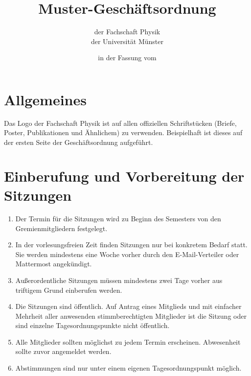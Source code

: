 


\pagestyle{scrheadings}

\title{Muster-Geschäftsordnung}
\subtitle{der Fachschaft Physik\\
der Universität Münster}
\date{in der Fassung vom }
\author{}



\maketitle

\section{Allgemeines}
Das Logo der Fachschaft Physik ist auf allen offiziellen Schriftstücken (Briefe, Poster, Publikationen und Ähnlichem) zu verwenden.
Beispielhaft ist dieses auf der ersten Seite der Geschäftsordnung aufgeführt.

\section{Einberufung und Vorbereitung der Sitzungen}
\begin{enumerate}
	\item Der Termin für die Sitzungen wird zu Beginn des Semesters von den Gremienmitgliedern festgelegt.
	\item In der vorlesungsfreien Zeit finden Sitzungen nur bei konkretem Bedarf statt.
	Sie werden mindestens eine Woche vorher durch den E-Mail-Verteiler oder Mattermost angekündigt.
	\item Außerordentliche Sitzungen müssen mindestens zwei Tage vorher aus triftigem Grund einberufen werden.
	\item Die Sitzungen sind öffentlich.
	Auf Antrag eines Mitglieds und mit einfacher Mehrheit aller anwesenden stimmberechtigten Mitglieder ist die Sitzung oder sind einzelne Tagesordnungspunkte nicht öffentlich.
	\item Alle Mitglieder sollten möglichst zu jedem Termin erscheinen.
	Abwesenheit sollte zuvor angemeldet werden.
	\item Abstimmungen sind nur unter einem eigenen Tagesordnungspunkt möglich.
\end{enumerate}

